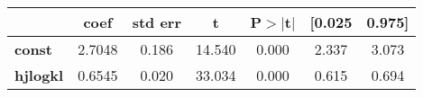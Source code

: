 \begin{center}
\begin{tabular}{lcccccc}
\toprule
                 & \textbf{coef} & \textbf{std err} & \textbf{t} & \textbf{P$> |$t$|$} & \textbf{[0.025} & \textbf{0.975]}  \\
\midrule
\textbf{const}   &       2.7048  &        0.186     &    14.540  &         0.000        &        2.337    &        3.073     \\
\textbf{hjlogkl} &       0.6545  &        0.020     &    33.034  &         0.000        &        0.615    &        0.694     \\
\bottomrule
\end{tabular}
\end{center}